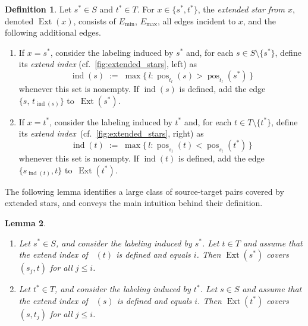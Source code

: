 \documentclass[11pt, letterpaper]{article}
\DeclareMathOperator{\pos}{pos}
\DeclareMathOperator{\minmat}{N_{\mathrm{min}}}
\DeclareMathOperator{\maxmat}{N_{\mathrm{max}}}
\DeclareMathOperator{\ext}{Ext}
\DeclareMathOperator{\extind}{ind}
\newcommand{\minedges}{E_{\mathrm{min}}}
\newcommand{\maxedges}{E_{\mathrm{max}}}
\theoremstyle{definition}
\newtheorem{definition}{Definition}
\theoremstyle{plain}
\newtheorem{lemma}[definition]{Lemma}
\begin{document}
\begin{definition}
\label{def:extended_star}
Let $s^*\in S$ and $t^*\in T$. For $x\in\{s^*,t^*\}$, the \emph{extended star from $x$}, denoted $\ext(x)$, consists of $\minedges$, $\maxedges$, all edges incident to $x$, and the following additional edges.
\begin{enumerate}[label=(\alph*)]
\item 
\label{def:extend_index_source}
If $x=s^*$, consider the labeling induced by $s^*$ and, for each $s\in S\setminus\{s^*\}$, define its \emph{extend index} (cf.~\cref{fig:extended_stars}, left) as
\[
    \extind (s) \;:=\; \max\bigl\{\,l : \pos_{t_l}(s) > \pos_{t_l}(s^*)\,\bigr\}
\]
whenever this set is nonempty. If $\extind(s)$ is defined, add the edge $\{s,\,t_{\extind(s)}\}$ to~$\ext(s^*)$.
\item 
\label{def:extend_index_target}
If $x=t^*$, consider the labeling induced by $t^*$ and, for each $t\in T\setminus\{t^*\}$, define its \emph{extend index}~(cf.~\cref{fig:extended_stars}, right) as
\[
    \extind (t) \;:=\; \max\bigl\{\,l : \pos_{s_l}(t) < \pos_{s_l}(t^*)\,\bigr\}
\]
whenever this set is nonempty. If $\extind(t)$ is defined, add the edge $\{s_{\extind(t)},t\}$ to~$\ext(t^*)$.
\end{enumerate}
\end{definition}


The following lemma identifies a large class of source-target pairs covered by extended stars, and conveys the main intuition behind their definition.

\begin{lemma}
\label{obs:extend_index_cover}
\leavevmode
\begin{enumerate}[topsep=2pt, label=(\alph*), beginpenalty=1000]
\item Let $s^*\in S$, and consider the labeling induced by $s^*$. Let $t\in T$ and assume that the extend index of $\maxmat(t)$ is defined and equals $i$. Then $\ext(s^*)$ covers $(s_j,t)$ for all $j\le i$.
\label{obs:extend_index_cover_source}
\item Let $t^*\in T$, and consider the labeling induced by $t^*$. Let $s\in S$ and assume that the extend index of $\minmat(s)$ is defined and equals $i$. Then $\ext(t^*)$ covers $(s,t_j)$ for all $j\le i$.
\label{obs:extend_index_cover_target}
\end{enumerate}
\end{lemma}
\end{document}
